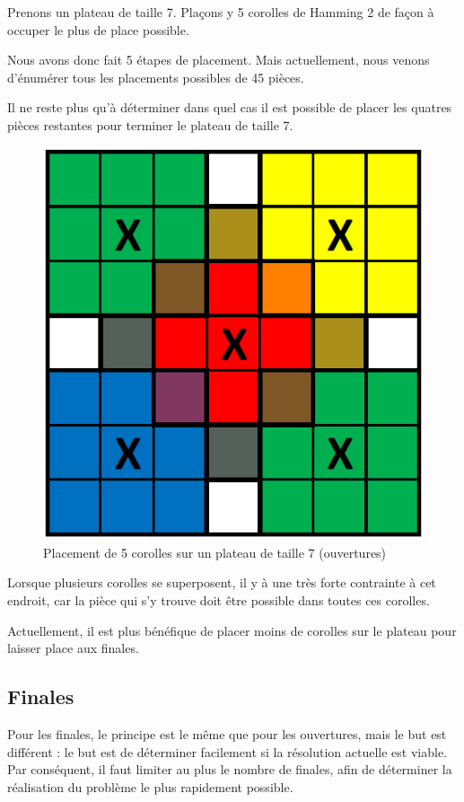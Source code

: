 	\begin{exmp}
		Prenons un plateau de taille 7. Plaçons y 5 corolles de Hamming 2 de façon à occuper le plus de place possible.
		
		Nous avons donc fait 5 étapes de placement. Mais actuellement, nous venons d'énumérer tous les placements possibles de 45 pièces.
		
		Il ne reste plus qu'à déterminer dans quel cas il est possible de placer les quatres pièces restantes pour terminer le plateau de taille 7.
		
		\begin{figure}[H]
			\begin{center}
				\includegraphics[width=0.5\linewidth]{images/corolle_placement}
			\end{center}
			\caption{Placement de 5 corolles sur un plateau de taille 7 (ouvertures)}\label{fig:corolle_placement}
		\end{figure}
		
		Lorsque plusieurs corolles se superposent, il y à une très forte contrainte à cet endroit, car la pièce qui s'y trouve doit être possible dans toutes ces corolles.
	\end{exmp}
	
	\begin{rem}
		Actuellement, il est plus bénéfique de placer moins de corolles sur le plateau pour laisser place aux finales.	
	\end{rem}
\newpage	

	\subsection{Finales}
	
		Pour les finales, le principe est le même que pour les ouvertures, mais le but est différent : le but est de déterminer facilement si la résolution actuelle est viable. Par conséquent, il faut limiter au plus le nombre de finales, afin de déterminer la réalisation du problème le plus rapidement possible.
		
